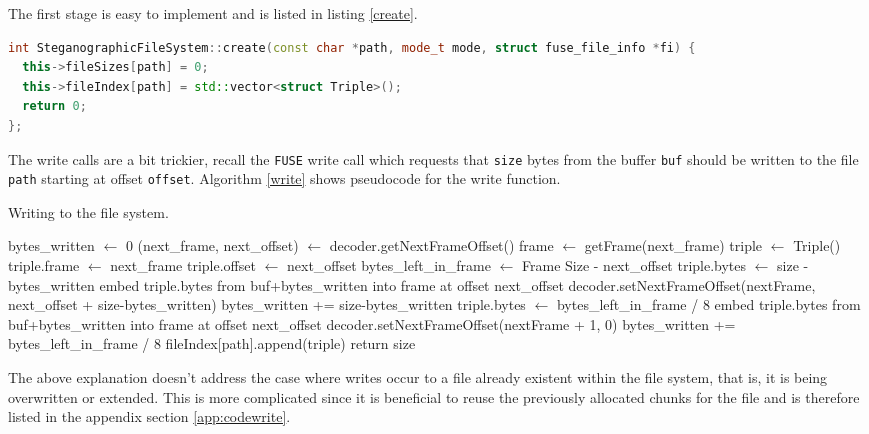 \documentclass[paper=a4, fontsize=11pt,twoside]{scrartcl}
\numberwithin{table}{section}
\numberwithin{figure}{section}
\numberwithin{algorithm}{section}
\begin{document}
The first stage is easy to implement and is listed in listing \ref{create}.

\begin{lstlisting}[language=C++, caption={The \texttt{create} function call (\texttt{fs/stegfs.cc:202}).}, frame=single, label=create,float,floatplacement=!Ht]
int SteganographicFileSystem::create(const char *path, mode_t mode, struct fuse_file_info *fi) {
  this->fileSizes[path] = 0;
  this->fileIndex[path] = std::vector<struct Triple>();
  return 0;
};
\end{lstlisting}

\noindent
The write calls are a bit trickier, recall the \texttt{FUSE} write call which requests that \texttt{size} bytes from the buffer \texttt{buf} should be written to the file \texttt{path} starting at offset \texttt{offset}. Algorithm \ref{write} shows pseudocode for the write function.\\

\begin{algorithm}[!h]
\caption{Writing to the file system.}
\label{write}
\begin{algorithmic}[1]
\State bytes\_written $\gets$ 0
	\State (next\_frame, next\_offset) $\gets$ decoder.getNextFrameOffset()
	\State frame $\gets$ getFrame(next\_frame)
	\State triple $\gets$ Triple()
	\State triple.frame $\gets$ next\_frame
	\State triple.offset $\gets$ next\_offset
	\State bytes\_left\_in\_frame $\gets$ Frame Size - next\_offset
		\State		
		\State triple.bytes $\gets$ size - bytes\_written
		\State embed triple.bytes from buf+bytes\_written into frame at offset next\_offset
		\State decoder.setNextFrameOffset(nextFrame, next\_offset + size-bytes\_written)
		\State bytes\_written += size-bytes\_written
	\Else
		\State		
		\State triple.bytes $\gets$ bytes\_left\_in\_frame / 8
		\State embed triple.bytes from buf+bytes\_written into frame at offset next\_offset
		\State decoder.setNextFrameOffset(nextFrame + 1, 0)
		\State bytes\_written += bytes\_left\_in\_frame / 8
	\EndIf
	\State fileIndex[path].append(triple)
\EndWhile
\State return size
\end{algorithmic}
\end{algorithm}

The above explanation doesn't address the case where writes occur to a file already existent within the file system, that is, it is being overwritten or extended. This is more complicated since it is beneficial to reuse the previously allocated chunks for the file and is therefore listed in the appendix section \ref{app:codewrite}.
\end{document}
